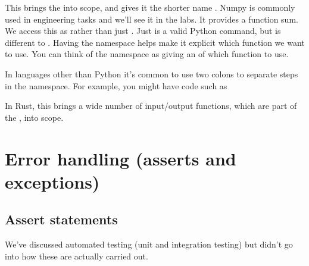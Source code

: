 \documentclass[letterpaper,10pt,british]{sphinxmanual}
\begin{document}
\sphinxAtStartPar
This brings the {\hyperref[\detokenize{chapters/software_development_tools/libraries:libraries}]{}}  into scope, and gives it the shorter name . Numpy is commonly used in engineering tasks and we’ll see it in the labs. It provides a function sum. We access this as  rather than just . Just  is a valid Python command, but is different to . Having the namespace  helps make it explicit which function we want to use. You can think of the namespace as giving an  of which function to use.

\sphinxAtStartPar
In languages other than Python it’s common to use two colons  to separate steps in the namespace. For example, you might have code such as

\begin{sphinxVerbatim}[commandchars=\\\{\}]
\end{sphinxVerbatim}

\sphinxAtStartPar
In Rust, this brings a wide number of input/output functions, which are part of the {\hyperref[\detokenize{chapters/software_development_tools/libraries:standard-library}]{}}, into scope.

\sphinxstepscope


\section{Error handling (asserts and exceptions)}
\label{\detokenize{chapters/programming_fundamentals/asserts_and_exceptions:error-handling-asserts-and-exceptions}}\label{\detokenize{chapters/programming_fundamentals/asserts_and_exceptions::doc}}

\subsection{Assert statements}
\label{\detokenize{chapters/programming_fundamentals/asserts_and_exceptions:assert-statements}}
\sphinxAtStartPar
We’ve discussed automated testing (unit and integration testing) {\hyperref[\detokenize{chapters/software_development_tools/automated_testing:automated-testing}]{}} but didn’t go into how these are actually carried out.
\end{document}
